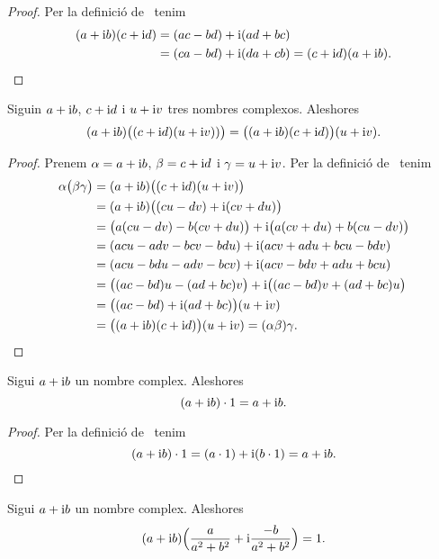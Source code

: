 \documentclass[../Apunts.tex]{subfiles}
\begin{document}
	\begin{proof}
		Per la definició de~ tenim
		\begin{align*}
			(a+\mathrm{i} b)(c+\mathrm{i} d)&=(ac-bd)+\mathrm{i}(ad+bc) \\
			&=(ca-bd)+\mathrm{i}(da+cb)=(c+\mathrm{i} d)(a+\mathrm{i} b).\qedhere
		\end{align*}
	\end{proof}
	\begin{proposition}
		\label{prop:els nombres complexos són associatius pel producte}
		Siguin \(a+\mathrm{i} b\), \(c+\mathrm{i} d\) i \(u+\mathrm{i} v\) tres nombres complexos. Aleshores
		\[(a+\mathrm{i} b)\big((c+\mathrm{i} d)(u+\mathrm{i} v))\big)=\big((a+\mathrm{i} b)(c+\mathrm{i} d)\big)(u+\mathrm{i} v).\]
	\end{proposition}
	\begin{proof}
		Prenem \(\alpha=a+\mathrm{i} b\), \(\beta=c+\mathrm{i} d\) i \(\gamma=u+\mathrm{i} v\). Per la definició de~ tenim
		\begin{align*}
			\alpha\big(\beta\gamma\big)&=(a+\mathrm{i} b)\big((c+\mathrm{i} d)(u+\mathrm{i} v)\big) \\
			&=(a+\mathrm{i} b)\big((cu-dv)+\mathrm{i}(cv+du)\big) \\
			&=\big(a(cu-dv)-b(cv+du)\big)+\mathrm{i}\big(a(cv+du)+b(cu-dv)\big) \\
			&=(acu-adv-bcv-bdu)+\mathrm{i}(acv+adu+bcu-bdv) \\
			&=(acu-bdu-adv-bcv)+\mathrm{i}(acv-bdv+adu+bcu) \\
			&=\big((ac-bd)u-(ad+bc)v\big)+\mathrm{i}\big((ac-bd)v+(ad+bc)u\big) \\
			&=\big((ac-bd)+\mathrm{i}(ad+bc)\big)(u+\mathrm{i} v) \\
			&=\big((a+\mathrm{i} b)(c+\mathrm{i} d)\big)(u+\mathrm{i} v)=(\alpha\beta)\gamma.\qedhere
		\end{align*}
	\end{proof}
	\begin{proposition}
		\label{prop:element neutre pel producte dels complexos}
		Sigui \(a+\mathrm{i} b\) un nombre complex. Aleshores
		\[(a+\mathrm{i} b)\cdot1=a+\mathrm{i} b.\]
	\end{proposition}
	\begin{proof}
		Per la definició de~ tenim
		\[(a+\mathrm{i} b)\cdot1=(a\cdot1)+\mathrm{i}(b\cdot1)=a+\mathrm{i} b.\qedhere\]
	\end{proof}
	\begin{proposition}
		\label{prop:element invers pel producte de nombres complexos}
		Sigui \(a+\mathrm{i} b\) un nombre complex. Aleshores
		\[(a+\mathrm{i} b)\Big(\frac{a}{a^{2}+b^{2}}+\mathrm{i}\frac{-b}{a^{2}+b^{2}}\Big)=1.\]
	\end{proposition}
\end{document}
